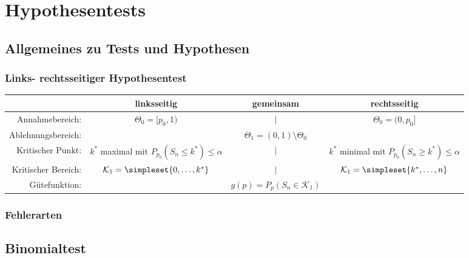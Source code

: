 \chapter{Hypothesentests}
\section{Allgemeines zu Tests und Hypothesen}


\subsection{Links- rechtsseitiger Hypothesentest}
\begin{center}
	\begin{tabular}{r|ccc}
		&linksseitig&gemeinsam&rechtsseitig\\\hline
		Annahmebereich:&$\Theta_0=[p_0,1)$&$\Big|$&$\Theta_0=(0,p_0]$\\
		Ablehnungsbereich:&&$\Theta_1=(0,1)\setminus\Theta_0$&\\
		Kritischer Punkt:&\makecell{$k^\ast$ maximal mit\\ $P_{p_0}(S_n\leq k^\ast)\leq\alpha$}&$\Bigg|$&\makecell{$k^\ast$ minimal mit\\ $P_{p_0}(S_n\geq k^\ast)\leq\alpha$}\\
		Kritischer Bereich:&$\mathcal K_1=\simpleset{0,\ldots,k^\ast}$&$\Big|$&$\mathcal K_1=\simpleset{k^\ast,\ldots,n}$\\
		Gütefunktion:&&$g(p)=P_p(S_n\in\mathcal K_1)$&
	\end{tabular}
\end{center}


\subsection{Fehlerarten}


\section{Binomialtest}

